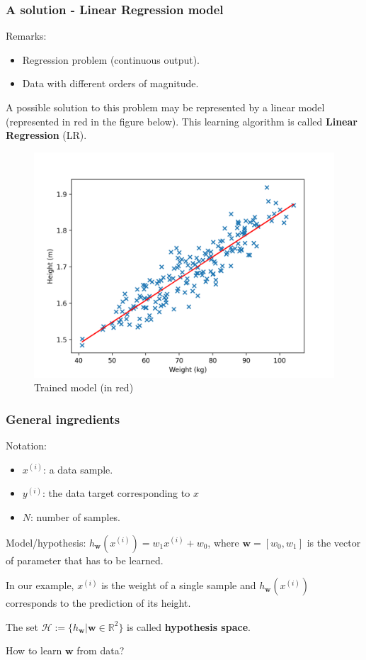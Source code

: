 \documentclass{beamer}
\begin{document}
	\begin{frame}
		\frametitle{A solution - Linear Regression model}
		Remarks:
		\begin{itemize}
			\item Regression problem (continuous output).
			\item Data with different orders of magnitude.
		\end{itemize}
		A possible solution to this problem may be represented by a linear model (represented in red in the figure below). This learning algorithm is called \textbf{Linear Regression} (LR).
		\begin{figure}
			\centering
			\includegraphics[scale=0.4]{images/linear_regression_fit}
			\caption{Trained model (in red)}
		\end{figure}
	\end{frame}

	\begin{frame}
		\frametitle{General ingredients}
		Notation:
		\begin{itemize}
			\item $x^{(i)}$: a data sample.
			\item $y^{(i)}$: the data target corresponding to $x$
			\item $N$: number of samples.
		\end{itemize}
	
		\vspace{5 mm}
		
		Model/hypothesis: $h_{\bm{w}}(x^{(i)}) = w_1x^{(i)} + w_0$, where $\bm{w} = [w_0, w_1]$ is the vector of parameter that has to be learned.
		
		In our example, $x^{(i)}$ is the weight of a single sample and $h_{\bm{w}}(x^{(i)})$ corresponds to the prediction of its height. 
		
		\vspace{5 mm}
		
		The set $\mathcal{H}:= \{h_{\bm{w}}| \bm{w} \in \mathbb{R}^2\}$ is called \textbf{hypothesis space}.
		
		\vspace{5 mm}
		
		How to learn $\bm{w}$ from data?
		
	\end{frame}
\end{document}
